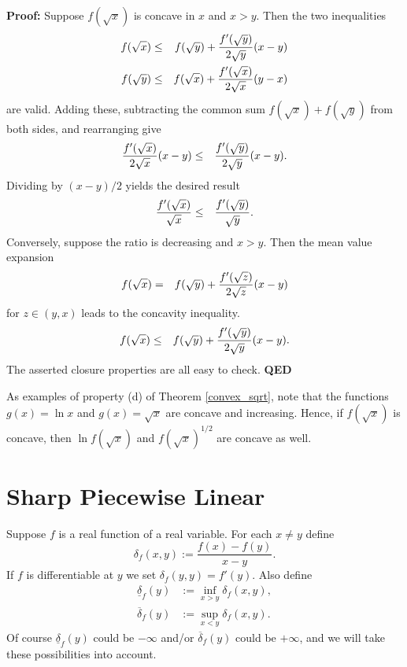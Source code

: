 \documentclass[
  12pt,
]{book}
\begin{document}
\textbf{Proof:} Suppose \(f(\sqrt{x})\) is concave in \(x\) and \(x >y\). Then the
two inequalities
\begin{eqnarray*}
f(\sqrt{x}) & \le & f(\sqrt{y})+{f'(\sqrt{y}) \over 2\sqrt{y}}(x-y) \\
f(\sqrt{y}) & \le & f(\sqrt{x})+{f'(\sqrt{x}) \over 2\sqrt{x}}(y-x)
\end{eqnarray*}
are valid. Adding these, subtracting the common sum
\(f(\sqrt{x})+f(\sqrt{y})\) from both sides, and rearranging give
\begin{eqnarray*}
{f'(\sqrt{x}) \over 2\sqrt{x}}(x-y) & \le &
{f'(\sqrt{y}) \over 2\sqrt{y}}(x-y) .
\end{eqnarray*}
Dividing by \((x-y)/2\) yields the desired result
\begin{eqnarray*}
{f'(\sqrt{x}) \over \sqrt{x}} & \le &
{f'(\sqrt{y}) \over \sqrt{y}} .
\end{eqnarray*}
Conversely, suppose the ratio is decreasing and \(x > y\). Then the mean value
expansion
\begin{eqnarray*}
f(\sqrt{x}) & = & f(\sqrt{y})+{f'(\sqrt{z}) \over 2\sqrt{z}}(x-y)
\end{eqnarray*}
for \(z \in (y,x)\) leads to the concavity inequality.
\begin{eqnarray*}
f(\sqrt{x}) & \le & f(\sqrt{y})+{f'(\sqrt{y}) \over 2\sqrt{y}}(x-y) .
\end{eqnarray*}
The asserted closure properties are all easy to check.
\textbf{QED}

As examples of property (d) of Theorem \ref{convex_sqrt}, note that the functions \(g(x) = \ln x\) and \(g(x) = \sqrt{x}\) are concave and increasing. Hence, if \(f(\sqrt{x})\) is concave, then \(\ln f(\sqrt{x})\) and \(f(\sqrt{x})^{1/2}\) are concave as well.

\hypertarget{sharp-piecewise-linear}{%
\section{Sharp Piecewise Linear}\label{sharp-piecewise-linear}}

Suppose \(f\) is a real function of a real variable. For each \(x\not= y\) define
\[
\delta_f(x,y):=\frac{f(x)-f(y)}{x-y}.
\]
If \(f\) is differentiable at \(y\) we set \(\delta_f(y,y)=f'(y)\).
Also define
\begin{align*}
\underline{\delta}_f(y)&:=\inf_{x>y} \delta_f(x,y),\\
\overline{\delta}_f(y)&:=\sup_{x<y} \delta_f(x,y).
\end{align*}
Of course \(\underline{\delta}_f(y)\) could be \(-\infty\) and/or
\(\overline{\delta}_f(y)\) could be \(+\infty\), and we will take these
possibilities into account.
\end{document}
